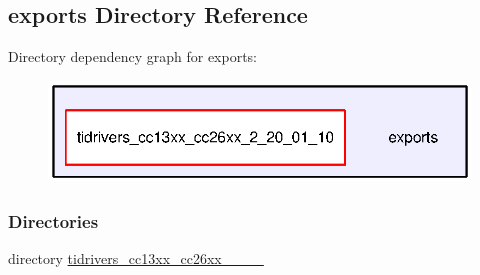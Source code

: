 \subsection{exports Directory Reference}
\label{dir_8e12c55741910517d775705110406c7c}
Directory dependency graph for exports\+:
\nopagebreak
\begin{figure}[H]
\begin{center}
\leavevmode
\includegraphics[width=325pt]{dir_8e12c55741910517d775705110406c7c_dep}
\end{center}
\end{figure}
\subsubsection*{Directories}
\begin{DoxyCompactItemize}
\item 
directory \hyperlink{dir_4427812c34aba6ec99f39f8627c59ccf}{tidrivers\+\_\+cc13xx\+\_\+cc26xx\+\_\+\_\+\_\+\_}
\end{DoxyCompactItemize}
